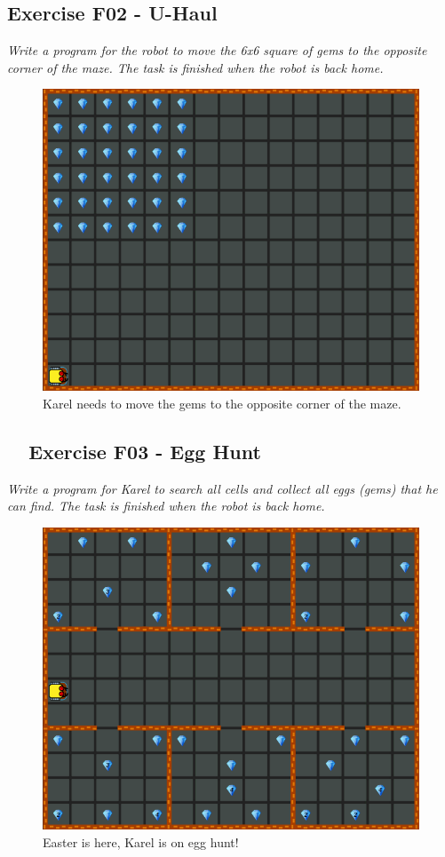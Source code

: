 {{{{\subsection{Exercise F02 - U-Haul}

{\em Write a program for the robot to move the 6x6 square of gems to the opposite corner of the maze. The task is finished when the robot is back home.}

\begin{figure}[!ht]
\begin{center}
\includegraphics[height=0.4\textwidth]{imgk/f02.png}
\end{center}
\vspace{-4mm}
\caption{Karel needs to move the gems to the opposite corner of the maze.}
\label{fig:f02}
\vspace{-10mm}
\end{figure}
\noindent
\newpage

\subsection{\ \ Exercise F03 - Egg Hunt}

{\em Write a program for Karel to search all cells and collect all eggs (gems) that he can find. The task is finished when the robot is back home.}


\begin{figure}[!ht]
\begin{center}
\includegraphics[height=0.4\textwidth]{imgk/f03.png}
\end{center}
\vspace{-4mm}
\caption{Easter is here, Karel is on egg hunt!}
\label{fig:f03}
\vspace{-10mm}
\end{figure}
\noindent

}}}}
